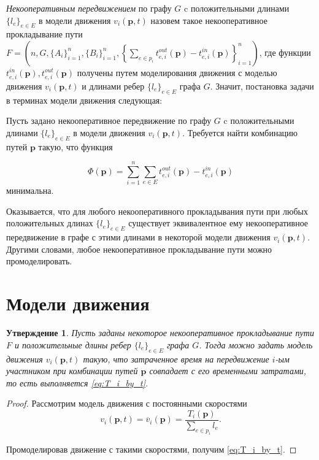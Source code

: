 \documentclass[12pt, a4paper]{article}
\newtheorem{state}{Утверждение}[section]
\begin{document}
\textit{Некооперативным передвижением} по графу $G$ c положительными длинами $\{l_e\}_{e \in E}$ в модели движения $v_i(\textbf{p}, t)$ назовем такое некооперативное прокладывание пути \\$F = \left(n, G, \{A_i\}_{i = 1}^{n}, \{B_i\}_{i = 1}^{n}, \left\{\sum\limits_{e \in p_i} t_{e, i}^{out}(\textbf{p}) - t_{e, i}^{in}(\textbf{p})\right\}_{i = 1}^{n}\right)$, где функции $t_{e, i}^{in}(\textbf{p}), t_{e, i}^{out}(\textbf{p})$ получены путем моделирования движения с моделью движения $v_i(\textbf{p}, t)$ и длинами ребер $\{l_e\}_{e \in E}$ графа $G$.
Значит, постановка задачи в терминах модели движения следующая:

Пусть задано некооперативное передвижение по графу $G$ c положительными длинами $\{l_e\}_{e \in E}$ в модели движения $v_i(\textbf{p}, t)$.
Требуется найти комбинацию путей $\textbf{p}$ такую, что функция 

\begin{equation}
\label{eq:target_task_end}
\Phi(\textbf{p}) =\sum \limits_{i = 1}^n \sum \limits_{e \in E} t_{e, i}^{out}(\textbf{p}) - t_{e, i}^{in}(\textbf{p})
\end{equation}
минимальна.

Оказывается, что для любого некооперативного прокладывания пути при любых положительных длинах $\{l_e\}_{e \in E}$ существует эквивалентное ему некооперативное передвижение в графе с этими длинами в некоторой модели движения $v_i(\textbf{p}, t)$. Другими словами, любое некооперативное прокладывание пути можно промоделировать.

\newpage
\section{Модели движения}

\label{sec:models}

\begin{state}
	\label{state:eqv}
	Пусть заданы некоторое некооперативное прокладывание пути $F$ и положительные длины ребер  $\{l_e\}_{e \in E}$ графа $G$. Тогда можно задать модель движения $v_i(\textbf{p}, t)$ такую, что затраченное время на передвижение $i$-ым участником при комбинации путей $\textbf{p}$ совпадает с его временными затратами, то есть выполняется \eqref{eq:T_i_by_t}.
	
\end{state}

\begin{proof}
Рассмотрим модель движения с постоянными скоростями  
$$v_i(\textbf{p}, t) = \overline{v}_i(\textbf{p}) = \frac{T_i (\textbf{p})}{\sum \limits_{e \in p_i} l_e}.$$

Промоделировав движение с такими скоростями, получим \eqref{eq:T_i_by_t}.
\end{proof}
\end{document}
